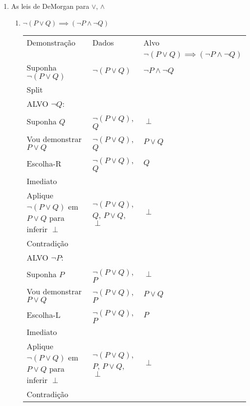 \documentclass[a4paper, 12pt]{article}
\begin{document}
\begin{enumerate}
    \newpage
    \item As leis de DeMorgan para $\lor$, $\land$
    \begin{enumerate}[1.]
        \item $\neg (P \lor Q) \implies (\neg P \land \neg Q)$
        \begin{table}[h!]
            \centering
            \begin{tabular}{|p{4cm} | p{4cm} | p{4cm} |}
            \rowcolor{gray!50}
            Demonstração & Dados & Alvo \\
            & & $\neg (P \lor Q) \implies (\neg P \land \neg Q)$\\
            Suponha $\neg(P \lor Q)$ & $\neg(P \lor Q)$ & $\neg P \land \neg Q$\\
            Split & & \\
            \hline
            ALVO $\neg Q$: & & \\
            Suponha $Q$ & $\neg(P \lor Q)$, $Q$ & $\perp$ \\
            \rowcolor{red!25}
            Vou demonstrar $P \lor Q$ & $\neg(P \lor Q)$, $Q$ & $P \lor Q$ \\
            \rowcolor{red!25}
            Escolha-R & $\neg(P \lor Q)$, $Q$ & $Q$ \\
            \rowcolor{red!25}
            Imediato & & \\
            Aplique $\neg (P \lor Q)$ em $P \lor Q$ para inferir $\perp$ & $\neg(P \lor Q)$, $Q$, $P \lor Q$, $\perp$ & $\perp$\\
            Contradição & & \\
            \hline
            ALVO $\neg P$: & & \\
            Suponha $P$ & $\neg (P \lor Q)$, $P$ & $\perp$\\
            \rowcolor{red!25}
            Vou demonstrar $P \lor Q$ & $\neg (P \lor Q)$, $P$ & $P \lor Q$ \\
            \rowcolor{red!25}
            Escolha-L & $\neg (P \lor Q)$, $P$ & $P$\\
            \rowcolor{red!25}
            Imediato & & \\
            Aplique $\neg (P \lor Q)$ em $P \lor Q$ para inferir $\perp$ & $\neg (P \lor Q)$, $P$, $P \lor Q$, $\perp$ & $\perp$\\
            Contradição & & \\
            \hline
            \end{tabular}
        \end{table}


\end{enumerate}
\end{enumerate}
\end{document}
